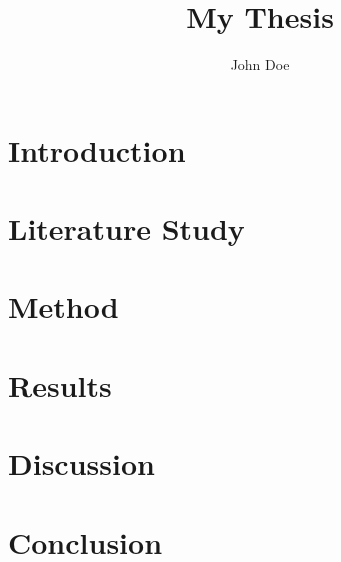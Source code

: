 \documentclass[10pt,b5paper,twoside,openright]{book}
\begin{document}
\def\mytitle{My Thesis}
\title{\mytitle}

\def\myauthor{John Doe}
\author{\myauthor}



\frontmatter
\pagestyle{plain}
\begingroup
\let\cleardoublepage\clearpage




\tableofcontents \clearpage
\listoftables    \clearpage
\listoffigures   \clearpage
\endgroup

\mainmatter{}
\pagestyle{headings}

\chapter{Introduction}\label{ch:introduction}


\chapter{Literature Study}\label{ch:literature-study}


\chapter{Method}\label{ch:method}


\chapter{Results}\label{ch:results}


\chapter{Discussion}\label{ch:discussion}


\chapter{Conclusion}\label{ch:conclusion}


\begin{flushleft}
	
	
\end{flushleft}


\end{document}
